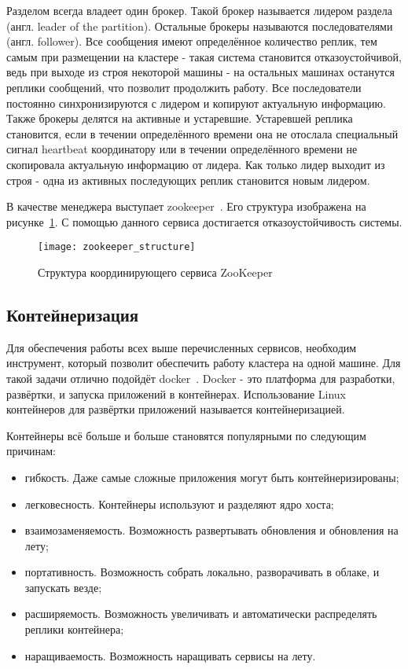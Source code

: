 Разделом всегда владеет один брокер.
Такой брокер называется лидером раздела (англ. leader of the partition).
Остальные брокеры называются последователями (англ. follower).
Все сообщения имеют определённое количество реплик, тем самым при размещении на кластере - такая система становится отказоустойчивой, ведь при выходе из строя некоторой машины - на остальных машинах останутся реплики сообщений, что позволит продолжить работу.
Все последователи постоянно синхронизируются с лидером и копируют актуальную информацию.
Также брокеры делятся на активные и устаревшие.
Устаревшей реплика становится, если в течении определённого времени она не отослала специальный сигнал heartbeat координатору или в течении определённого времени не скопировала актуальную информацию от лидера.
Как только лидер выходит из строя - одна из активных последующих реплик становится новым лидером.

В качестве менеджера выступает zookeeper~\cite{zookeeper_documentation_intro}.
Его структура изображена на рисунке~\ref{pic:lit_review:zookeeper_structure}.                   
С помощью данного сервиса достигается отказоустойчивость системы.

\begin{figure}
    \centering
    \texttt{[image: zookeeper\_structure]}
    \caption{Структура координирующего сервиса ZooKeeper~\cite{zookeeper_documentation_intro}}
    \label{pic:lit_review:zookeeper_structure}
\end{figure}

\subsection{Контейнеризация}

Для обеспечения работы всех выше перечисленных сервисов, необходим инструмент, который позволит обеспечить работу кластера на одной машине.
Для такой задачи отлично подойдёт docker~\cite{docker_documentation_intro}.
Docker - это платформа для разработки, развёртки, и запуска приложений в контейнерах.
Использование Linux контейнеров для развёртки приложений называется контейнеризацией.

Контейнеры всё больше и больше становятся популярными по следующим причинам:
\begin{itemize}
    \item гибкость. Даже самые сложные приложения могут быть контейнеризированы;
    \item легковесность. Контейнеры используют и разделяют ядро хоста;
    \item взаимозаменяемость. Возможность развертывать обновления и обновления на лету;
    \item портативность. Возможность собрать локально, разворачивать в облаке, и запускать везде;
    \item расширяемость. Возможность увеличивать и автоматически распределять реплики контейнера;
    \item наращиваемость. Возможность наращивать сервисы на лету.
\end{itemize}

